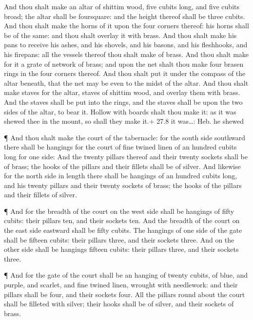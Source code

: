  And thou shalt make an altar of shittim wood, five cubits
long, and five cubits broad; the altar shall be foursquare: and the
height thereof shall be three cubits.  And thou shalt make
the horns of it upon the four corners thereof: his horns shall be of the
same: and thou shalt overlay it with brass.  And thou shalt
make his pans to receive his ashes, and his shovels, and his basons, and
his fleshhooks, and his firepans: all the vessels thereof thou shalt
make of brass.  And thou shalt make for it a grate of
network of brass; and upon the net shalt thou make four brasen rings in
the four corners thereof.  And thou shalt put it under the
compass of the altar beneath, that the net may be even to the midst of
the altar.  And thou shalt make staves for the altar, staves
of shittim wood, and overlay them with brass.  And the
staves shall be put into the rings, and the staves shall be upon the two
sides of the altar, to bear it.  Hollow with boards shalt
thou make it: as it was shewed thee in the mount, so shall they make
it.+ 27.8 it was\ldots: Heb. he shewed

 ¶ And thou shalt make the court of the tabernacle: for the
south side southward there shall be hangings for the court of fine
twined linen of an hundred cubits long for one side:  And
the twenty pillars thereof and their twenty sockets shall be of brass;
the hooks of the pillars and their fillets shall be of silver.
 And likewise for the north side in length there shall be
hangings of an hundred cubits long, and his twenty pillars and their
twenty sockets of brass; the hooks of the pillars and their fillets of
silver.

 ¶ And for the breadth of the court on the west side shall
be hangings of fifty cubits: their pillars ten, and their sockets ten.
 And the breadth of the court on the east side eastward
shall be fifty cubits.  The hangings of one side of the
gate shall be fifteen cubits: their pillars three, and their sockets
three.  And on the other side shall be hangings fifteen
cubits: their pillars three, and their sockets three.

 ¶ And for the gate of the court shall be an hanging of
twenty cubits, of blue, and purple, and scarlet, and fine twined linen,
wrought with needlework: and their pillars shall be four, and their
sockets four.  All the pillars round about the court shall
be filleted with silver; their hooks shall be of silver, and their
sockets of brass.

